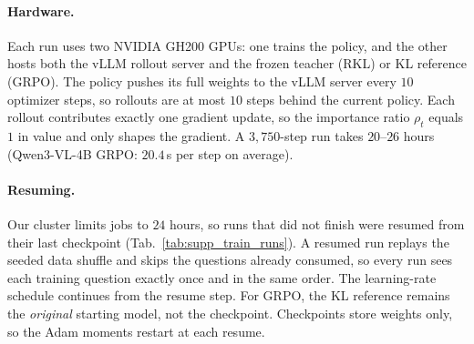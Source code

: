 \paragraph{Hardware.}
Each run uses two NVIDIA GH200 GPUs: one trains the policy, and the other hosts both the
vLLM rollout server and the frozen teacher (RKL) or KL reference (GRPO). The policy
pushes its full weights to the vLLM server every $10$ optimizer steps, so rollouts are at
most $10$ steps behind the current policy. Each rollout contributes exactly one gradient
update, so the importance ratio $\rho_t$ equals $1$ in value and only shapes the
gradient. A $3{,}750$-step run takes $20$--$26$ hours (Qwen3-VL-4B GRPO: $20.4$\,s per
step on average).

\paragraph{Resuming.}
Our cluster limits jobs to $24$ hours, so runs that did not finish were resumed from
their last checkpoint (Tab.~\ref{tab:supp_train_runs}). A resumed run replays the seeded
data shuffle and skips the questions already consumed, so every run sees each training
question exactly once and in the same order. The learning-rate schedule continues from
the resume step. For GRPO, the KL reference remains the \emph{original} starting model,
not the checkpoint. Checkpoints store weights only, so the Adam moments restart at each
resume. %

